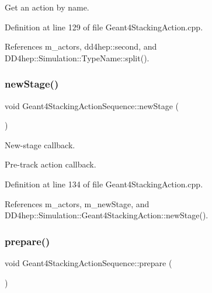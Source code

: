 Get an action by name. 



Definition at line 129 of file Geant4\+Stacking\+Action.\+cpp.



References m\+\_\+actors, dd4hep\+::second, and D\+D4hep\+::\+Simulation\+::\+Type\+Name\+::split().

\hypertarget{class_d_d4hep_1_1_simulation_1_1_geant4_stacking_action_sequence_a8077fe558cebbeeef5af0114abab6a55}{}\label{class_d_d4hep_1_1_simulation_1_1_geant4_stacking_action_sequence_a8077fe558cebbeeef5af0114abab6a55} 
\subsubsection{\texorpdfstring{new\+Stage()}{newStage()}}
{\footnotesize\ttfamily void Geant4\+Stacking\+Action\+Sequence\+::new\+Stage (\begin{DoxyParamCaption}{ }\end{DoxyParamCaption})\hspace{0.3cm}{\ttfamily [virtual]}}



New-\/stage callback. 

Pre-\/track action callback. 

Definition at line 134 of file Geant4\+Stacking\+Action.\+cpp.



References m\+\_\+actors, m\+\_\+new\+Stage, and D\+D4hep\+::\+Simulation\+::\+Geant4\+Stacking\+Action\+::new\+Stage().

\hypertarget{class_d_d4hep_1_1_simulation_1_1_geant4_stacking_action_sequence_a77ab67508d46a2af265090b04d5a41cb}{}\label{class_d_d4hep_1_1_simulation_1_1_geant4_stacking_action_sequence_a77ab67508d46a2af265090b04d5a41cb} 
\subsubsection{\texorpdfstring{prepare()}{prepare()}}
{\footnotesize\ttfamily void Geant4\+Stacking\+Action\+Sequence\+::prepare (\begin{DoxyParamCaption}{ }\end{DoxyParamCaption})\hspace{0.3cm}{\ttfamily [virtual]}}



